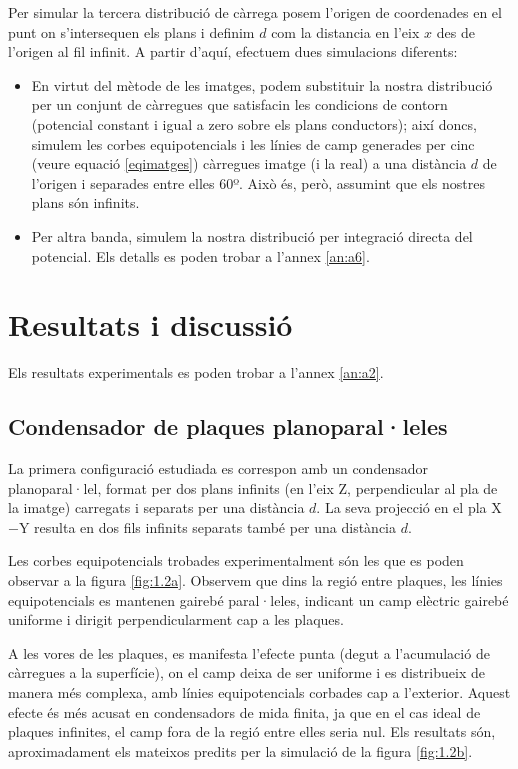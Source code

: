 \documentclass[a4paper,10.5pt]{report}
\begin{document}
Per simular la tercera distribució de càrrega posem l'origen de coordenades en el punt on s'intersequen els plans i definim $d$ com la distancia en l'eix $x$ des de l'origen al fil infinit. A partir d'aquí, efectuem dues simulacions diferents:
\begin{itemize}
	\item En virtut del mètode de les imatges, podem substituir la nostra distribució per un conjunt de càrregues que satisfacin les condicions de contorn (potencial constant i igual a zero sobre els plans conductors); així doncs, simulem les corbes equipotencials i les línies de camp generades per cinc (veure equació \eqref{eqimatges}) càrregues imatge (i la real) a una distància $d$ de l'origen i separades entre elles 60º. Això és, però, assumint que els nostres plans són infinits.
	\item Per altra banda, simulem la nostra distribució per integració directa del potencial. Els detalls es poden trobar a l'annex \ref{an:a6}.
\end{itemize}

\section{Resultats i discussió}
Els resultats experimentals es poden trobar a l'annex \ref{an:a2}.

\subsection{Condensador de plaques planoparal·leles}
La primera configuració estudiada es correspon amb un condensador planoparal·lel, format per dos plans infinits (en l'eix Z, perpendicular al pla de la imatge) carregats i separats per una distància $d$. La seva projecció en el pla X$-$Y  resulta en dos fils infinits separats també per una distància $d$.

Les corbes equipotencials trobades experimentalment són les que es poden observar a la figura \ref{fig:1.2a}. Observem que dins la regió entre plaques, les línies equipotencials es mantenen gairebé paral·leles, indicant un camp elèctric gairebé uniforme i dirigit perpendicularment cap a les plaques. 

A les vores de les plaques, es manifesta l’efecte punta (degut a l'acumulació de càrregues a la superfície), on el camp deixa de ser uniforme i es distribueix de manera més complexa, amb línies equipotencials corbades cap a l’exterior. Aquest efecte és més acusat en condensadors de mida finita, ja que en el cas ideal de plaques infinites, el camp fora de la regió entre elles seria nul. Els resultats són, aproximadament els mateixos predits per la simulació de la figura \ref{fig:1.2b}.
\end{document}
